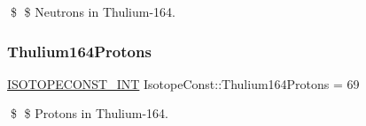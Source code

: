 \$ \$ Neutrons in Thulium-\/164. \mbox{\label{group___isotope_const-_thulium-_tm164_ga61d1c7ebd4ca82278ab7c1d6fd6ce184}} 
\subsubsection{\texorpdfstring{Thulium164\+Protons}{Thulium164Protons}}
{\footnotesize\ttfamily \mbox{\hyperlink{group___isotope_const-_macros_ga5f18360b3e99483a35c32d789e62621c}{I\+S\+O\+T\+O\+P\+E\+C\+O\+N\+S\+T\+\_\+\+I\+NT}} Isotope\+Const\+::\+Thulium164\+Protons = 69}

\$ \$ Protons in Thulium-\/164. 